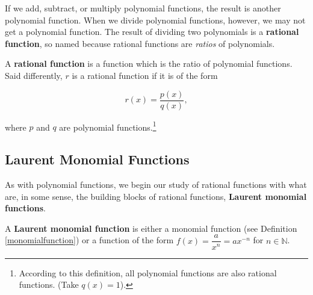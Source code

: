 
\setcounter{footnote}{0}

\label{IntroRational}

If we add, subtract, or multiply polynomial functions, the result is another polynomial function.  When we divide polynomial functions, however, we may not get a polynomial function.   The result of dividing two polynomials is a    \textbf{rational function}, so named because rational functions  are \textit{ratios} of polynomials.

\begin{mdefn}  \label{rationalfunction} A \textbf{rational function} is a function which is the ratio of polynomial functions.  Said differently, $r$ is a rational function if it is of the form 

\[ r(x) = \dfrac{p(x)}{q(x)},\]

where $p$ and $q$ are polynomial functions.\footnote{According to this definition, all polynomial functions are also  rational functions. (Take $q(x) = 1$).}

\end{mdefn}

\subsection{Laurent Monomial Functions}
\label{LaurentMonomialFunctionsSection}

As with polynomial functions, we begin our study of rational functions with what are, in some sense, the building blocks of rational functions, \textbf{Laurent monomial functions}.  

\begin{mdefn}  \label{laurentmonomialfunction} A \textbf{Laurent monomial function} is either a monomial function (see Definition \ref{monomialfunction}) or a function of the form $f(x) = \dfrac{a}{x^n} = ax^{-n}$ for $n \in \mathbb{N}$.

\end{mdefn}

